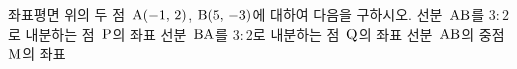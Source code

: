 좌표평면 위의 두 점~$\mathrm{A}(-1,\,2)$, $\mathrm{B}(5,\,-3)$에 대하여 다음을 구하시오.
 선분~$\mathrm{AB}$를 $3:2$로 내분하는 점~$\mathrm{P}$의 좌표
 선분~$\mathrm{BA}$를 $3:2$로 내분하는 점~$\mathrm{Q}$의 좌표
 선분~$\mathrm{AB}$의 중점~$\mathrm{M}$의 좌표

